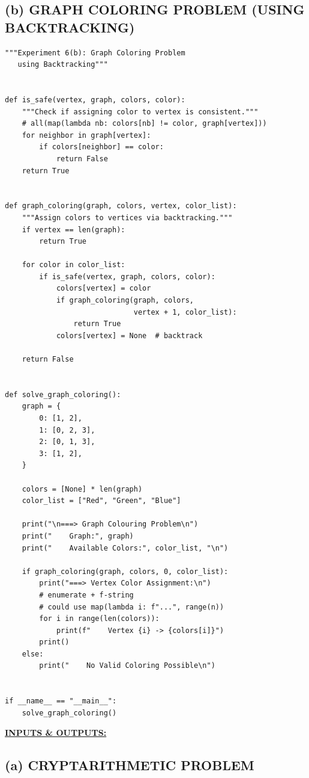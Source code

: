 \documentclass[12pt,a4paper]{article}
\begin{document}
\subsection{(b) GRAPH COLORING PROBLEM (USING BACKTRACKING)}

\begin{lstlisting}[style=pythonstyle]
"""Experiment 6(b): Graph Coloring Problem
   using Backtracking"""


def is_safe(vertex, graph, colors, color):
    """Check if assigning color to vertex is consistent."""
    # all(map(lambda nb: colors[nb] != color, graph[vertex]))
    for neighbor in graph[vertex]:
        if colors[neighbor] == color:
            return False
    return True


def graph_coloring(graph, colors, vertex, color_list):
    """Assign colors to vertices via backtracking."""
    if vertex == len(graph):
        return True

    for color in color_list:
        if is_safe(vertex, graph, colors, color):
            colors[vertex] = color
            if graph_coloring(graph, colors,
                              vertex + 1, color_list):
                return True
            colors[vertex] = None  # backtrack

    return False


def solve_graph_coloring():
    graph = {
        0: [1, 2],
        1: [0, 2, 3],
        2: [0, 1, 3],
        3: [1, 2],
    }

    colors = [None] * len(graph)
    color_list = ["Red", "Green", "Blue"]

    print("\n===> Graph Colouring Problem\n")
    print("    Graph:", graph)
    print("    Available Colors:", color_list, "\n")

    if graph_coloring(graph, colors, 0, color_list):
        print("===> Vertex Color Assignment:\n")
        # enumerate + f-string
        # could use map(lambda i: f"...", range(n))
        for i in range(len(colors)):
            print(f"    Vertex {i} -> {colors[i]}")
        print()
    else:
        print("    No Valid Coloring Possible\n")


if __name__ == "__main__":
    solve_graph_coloring()
\end{lstlisting}

\vspace{0.5cm}
\textbf{\underline{INPUTS \& OUTPUTS:}}

\subsection{(a) CRYPTARITHMETIC PROBLEM}
\end{document}
